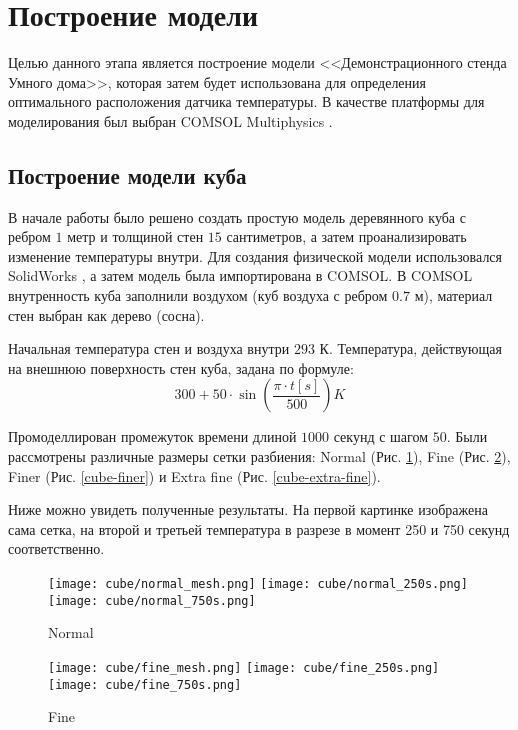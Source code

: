 \graphicspath{{./images/model}}
\section{Построение модели}

Целью данного этапа является построение модели <<Демонстрационного стенда Умного дома>>, которая затем будет использована для определения оптимального расположения датчика температуры. В качестве платформы для моделирования был выбран COMSOL Multiphysics \cite{comsol}.


\subsection{Построение модели куба}

В начале работы было решено создать простую модель деревянного куба с ребром $1$ метр и толщиной стен $15$ сантиметров, а затем проанализировать изменение температуры внутри. Для создания физической модели использовался SolidWorks \cite{solidworks}, а затем модель была импортирована в COMSOL. В COMSOL внутренность куба заполнили воздухом (куб воздуха с ребром $0.7$ м), материал стен выбран как дерево (сосна).

Начальная температура стен и воздуха внутри $293$ К. Температура, действующая на внешнюю поверхность стен куба, задана по формуле:
\[300 + 50 \cdot \sin(\frac{\pi \cdot t[s]}{500}) K\]

Промоделлирован промежуток времени длиной $1000$ секунд с шагом $50$.
Были рассмотрены различные размеры сетки разбиения: Normal (Рис. \ref{cube-normal}), Fine (Рис. \ref{cube-fine}), Finer (Рис. \ref{cube-finer}) и Extra fine (Рис. \ref{cube-extra-fine}).

Ниже можно увидеть полученные результаты. На первой картинке изображена сама сетка, на второй и третьей температура в разрезе в момент 250 и 750 секунд соответственно.

\begin{figure}[H]
\texttt{[image: cube/normal\_mesh.png]}\hfill
\texttt{[image: cube/normal\_250s.png]}\hfill
\texttt{[image: cube/normal\_750s.png]}\hfill
\caption{Normal}
\label{cube-normal}
\end{figure}

\begin{figure}[H]
\texttt{[image: cube/fine\_mesh.png]}\hfill
\texttt{[image: cube/fine\_250s.png]}\hfill
\texttt{[image: cube/fine\_750s.png]}\hfill
\caption{Fine}
\label{cube-fine}
\end{figure}

